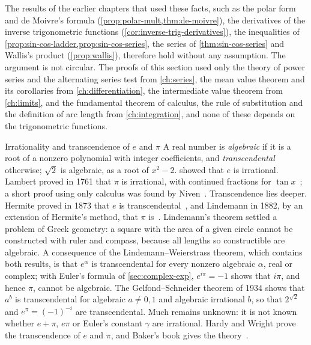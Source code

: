The results of the earlier chapters that used these facts, such as the polar form and de Moivre's formula (\cref{prop:polar-mult,thm:de-moivre}), the derivatives of the inverse trigonometric functions (\cref{cor:inverse-trig-derivatives}), the inequalities of \cref{prop:sin-cos-ladder,prop:sin-cos-series}, the series of \cref{thm:sin-cos-series} and Wallis's product (\cref{prop:wallis}), therefore hold without any assumption. The argument is not circular. The proofs of this section used only the theory of power series and the alternating series test from \cref{ch:series}, the mean value theorem and its corollaries from \cref{ch:differentiation}, the intermediate value theorem from \cref{ch:limits}, and the fundamental theorem of calculus, the rule of substitution and the definition of arc length from \cref{ch:integration}, and none of these depends on the trigonometric functions.

\begin{note}{Irrationality and transcendence of $e$ and $\pi$}
A real number is \emph{algebraic} if it is a root of a nonzero polynomial with integer coefficients, and \emph{transcendental} otherwise; $\sqrt2$ is algebraic, as a root of $x^2-2$.  showed that $e$ is irrational. Lambert proved in 1761 that $\pi$ is irrational, with continued fractions for $\tan x$~\cite{lambert1768}; a short proof using only calculus was found by Niven~\cite{niven1947}. Transcendence lies deeper. Hermite proved in 1873 that $e$ is transcendental~\cite{hermite1873}, and Lindemann in 1882, by an extension of Hermite's method, that $\pi$ is~\cite{lindemann1882}. Lindemann's theorem settled a problem of Greek geometry: a square with the area of a given circle cannot be constructed with ruler and compass, because all lengths so constructible are algebraic. A consequence of the Lindemann--Weierstrass theorem, which contains both results, is that $e^\alpha$ is transcendental for every nonzero algebraic $\alpha$, real or complex; with Euler's formula of \cref{sec:complex-exp}, $e^{i\pi}=-1$ shows that $i\pi$, and hence $\pi$, cannot be algebraic. The Gelfond--Schneider theorem of 1934 shows that $a^b$ is transcendental for algebraic $a\ne0,1$ and algebraic irrational $b$, so that $2^{\sqrt2}$ and $e^\pi=(-1)^{-i}$ are transcendental. Much remains unknown: it is not known whether $e+\pi$, $e\pi$ or Euler's constant $\gamma$ are irrational. Hardy and Wright prove the transcendence of $e$ and $\pi$, and Baker's book gives the theory~\cite{hardywright2008,baker1975}.
\end{note}


